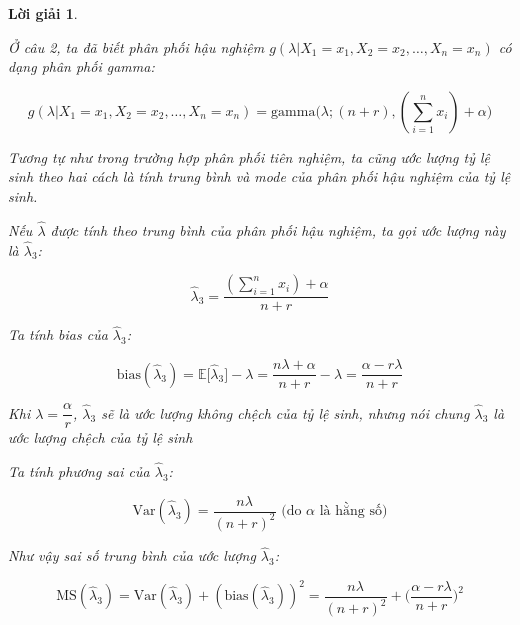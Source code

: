 \documentclass[14pt, a4paper]{article}
\theoremstyle{sltheorem}
\theoremstyle{soltheorem}
\newtheorem*{loigiai}{Lời giải}
\begin{document}
\begin{loigiai}
\begin{enumerate}
\begin{itemize}
            Ở câu 2, ta đã biết phân phối hậu nghiệm $g(\lambda \vert X_1 =x_1, X_2=x_2, \dots, X_n=x_n)$ có dạng phân phối gamma:

            \begin{equation*}
                g(\lambda \vert X_1 =x_1, X_2=x_2, \dots, X_n=x_n) = \text{gamma}\big(\lambda; (n+r), (\sum_{i=1}^n x_i) + \alpha \big)
            \end{equation*}

            Tương tự như trong trường hợp phân phối tiên nghiệm, ta cũng ước lượng tỷ lệ sinh theo hai cách là tính trung bình và mode của phân phối hậu nghiệm của tỷ lệ sinh.

            Nếu $\hat{\lambda}$ được tính theo trung bình của phân phối hậu nghiệm,
            ta gọi ước lượng này là $\hat{\lambda}_3$:

            \begin{equation*}
                \hat{\lambda}_3 = \dfrac{(\sum_{i=1}^n x_i) + \alpha}{n + r}
            \end{equation*}

            Ta tính bias của $\hat{\lambda}_3$:

            \begin{equation*}
                \text{bias}(\hat{\lambda}_3) = \mathbb{E} \lbrack \hat{\lambda}_3 \rbrack - \lambda = \dfrac{n\lambda + \alpha}{n + r} - \lambda = \dfrac{\alpha - r\lambda}{n + r}
            \end{equation*}

            Khi $\lambda = \dfrac{\alpha}{r}$, $\hat{\lambda}_3$ sẽ là ước lượng không chệch của tỷ lệ sinh, nhưng nói chung $\hat{\lambda}_3$ là ước lượng chệch của tỷ lệ sinh

            Ta tính phương sai của $\hat{\lambda}_3$:
            
            \begin{equation*}
                \text{Var}(\hat{\lambda}_3) = \dfrac{n\lambda}{(n+r)^2} \text{ (do } \alpha \text{ là hằng số)}
            \end{equation*}

            Như vậy sai số trung bình của ước lượng $\hat{\lambda}_3$:

            \begin{equation*}
                \text{MS}(\hat{\lambda}_3) = \text{Var}(\hat{\lambda}_3) + (\text{bias}(\hat{\lambda}_3))^2 = \dfrac{n\lambda}{(n+r)^2} + \Big( \dfrac{\alpha - r\lambda}{n + r} \Big)^2
            \end{equation*}
            

\end{itemize}
\end{enumerate}
\end{loigiai}
\end{document}

